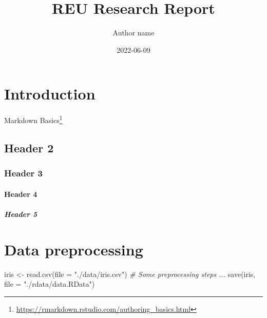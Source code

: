\documentclass[
  11pt,
  oneside]{book}
\title{REU Research Report}
\author{Author name}
\date{2022-06-09}
\newenvironment{Shaded}{\begin{snugshade}}{\end{snugshade}}
\newcommand{\AttributeTok}[1]{\textcolor[rgb]{0.77,0.63,0.00}{#1}}
\newcommand{\CommentTok}[1]{\textcolor[rgb]{0.56,0.35,0.01}{\textit{#1}}}
\newcommand{\FunctionTok}[1]{\textcolor[rgb]{0.00,0.00,0.00}{#1}}
\newcommand{\NormalTok}[1]{#1}
\newcommand{\OtherTok}[1]{\textcolor[rgb]{0.56,0.35,0.01}{#1}}
\newcommand{\StringTok}[1]{\textcolor[rgb]{0.31,0.60,0.02}{#1}}
\renewcommand{\href}[2]{#2\footnote{\url{#1}}}
\begin{document}
\maketitle

{
\hypersetup{linkcolor=}
\setcounter{tocdepth}{2}
\tableofcontents
}
\listoffigures
\listoftables
\mainmatter

\hypertarget{index}{%
\chapter{Introduction}\label{index}}

\href{https://rmarkdown.rstudio.com/authoring_basics.html}{Markdown Basics}

\hypertarget{header-2}{%
\section{Header 2}\label{header-2}}

\hypertarget{header-3}{%
\subsection{Header 3}\label{header-3}}

\hypertarget{header-4}{%
\subsubsection{Header 4}\label{header-4}}

\hypertarget{header-5}{%
\paragraph{Header 5}\label{header-5}}

\hypertarget{data-preprocessing}{%
\chapter{Data preprocessing}\label{data-preprocessing}}

\begin{Shaded}
\begin{Highlighting}[]
\NormalTok{iris }\OtherTok{\textless{}{-}} \FunctionTok{read.csv}\NormalTok{(}\AttributeTok{file =} \StringTok{"./data/iris.csv"}\NormalTok{)}
\CommentTok{\# Some preprocessing steps ...}
\FunctionTok{save}\NormalTok{(iris, }\AttributeTok{file =} \StringTok{"./rdata/data.RData"}\NormalTok{)}
\end{Highlighting}
\end{Shaded}
\end{document}
